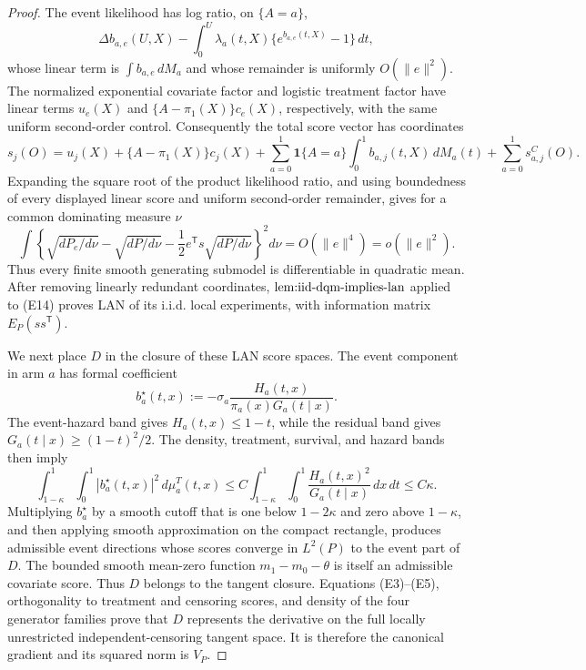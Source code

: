 \documentclass{article}
\begin{document}
\begin{proof}
The event likelihood has log ratio, on \(\{A=a\}\),
\[
 \Delta b_{a,e}(U,X)-\int_0^U\lambda_a(t,X)
                  \{e^{b_{a,e}(t,X)}-1\}\,dt,
\]
whose linear term is \(\int b_{a,e}\,dM_a\) and whose remainder is uniformly \(O(\lVert e\rVert^2)\).  The normalized exponential covariate factor and logistic treatment factor have linear terms \(u_e(X)\) and \(\{A-\pi_1(X)\}c_e(X)\), respectively, with the same uniform second-order control.  Consequently the total score vector has coordinates
\[
 s_j(O)=u_j(X)+\{A-\pi_1(X)\}c_j(X)
 +\sum_{a=0}^1\mathbf 1\{A=a\}\int_0^1b_{a,j}(t,X)\,dM_a(t)
 +\sum_{a=0}^1s^C_{a,j}(O).                                           \tag{E13}
\]
Expanding the square root of the product likelihood ratio, and using boundedness of every displayed linear score and uniform second-order remainder, gives for a common dominating measure \(\nu\)
\[
 \int\left\{\sqrt{dP_e/d\nu}-\sqrt{dP/d\nu}
       -\frac12e^{\mathsf T}s\sqrt{dP/d\nu}\right\}^2d\nu
 =O(\lVert e\rVert^4)=o(\lVert e\rVert^2).                            \tag{E14}
\]
Thus every finite smooth generating submodel is differentiable in quadratic mean.  After removing linearly redundant coordinates, \(\textnormal{lem:iid-dqm-implies-lan}\) applied to (E14) proves LAN of its i.i.d. local experiments, with information matrix \(E_P(ss^{\mathsf T})\).

We next place \(D\) in the closure of these LAN score spaces.  The event component in arm \(a\) has formal coefficient
\[
 b_a^{\star}(t,x):=-\sigma_a\frac{H_a(t,x)}{\pi_a(x)G_a(t\mid x)}.
\]
The event-hazard band gives \(H_a(t,x)\le1-t\), while the residual band gives \(G_a(t\mid x)\ge(1-t)^2/2\).  The density, treatment, survival, and hazard bands then imply
\[
 \int_{1-\kappa}^1\!\int_0^1|b_a^{\star}(t,x)|^2\,d\mu_a^T(t,x)
 \le C\int_{1-\kappa}^1\!\int_0^1
             \frac{H_a(t,x)^2}{G_a(t\mid x)}\,dx\,dt
 \le C\kappa.                                                         \tag{E15}
\]
Multiplying \(b_a^{\star}\) by a smooth cutoff that is one below \(1-2\kappa\) and zero above \(1-\kappa\), and then applying smooth approximation on the compact rectangle, produces admissible event directions whose scores converge in \(L^2(P)\) to the event part of \(D\).  The bounded smooth mean-zero function \(m_1-m_0-\theta\) is itself an admissible covariate score.  Thus \(D\) belongs to the tangent closure.  Equations (E3)--(E5), orthogonality to treatment and censoring scores, and density of the four generator families prove that \(D\) represents the derivative on the full locally unrestricted independent-censoring tangent space.  It is therefore the canonical gradient and its squared norm is \(V_P\).


\end{proof}
\end{document}
